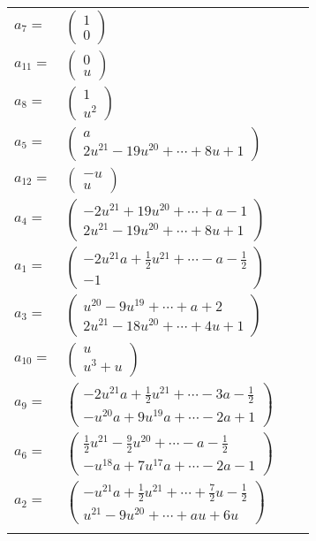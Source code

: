 \documentclass[1p]{elsarticle_modified}
\theoremstyle{definition}
\begin{document}
\begin{tabular}{m{7pt} m{180pt} m{7pt} m{180pt} }
\flushright $a_{7}=$&$\begin{pmatrix}1\\0\end{pmatrix}$ \\
\flushright $a_{11}=$&$\begin{pmatrix}0\\u\end{pmatrix}$ \\
\flushright $a_{8}=$&$\begin{pmatrix}1\\u^2\end{pmatrix}$ \\
\flushright $a_{5}=$&$\begin{pmatrix}a\\2 u^{21}-19 u^{20}+\cdots+8 u+1\end{pmatrix}$ \\
\flushright $a_{12}=$&$\begin{pmatrix}- u\\u\end{pmatrix}$ \\
\flushright $a_{4}=$&$\begin{pmatrix}-2 u^{21}+19 u^{20}+\cdots+a-1\\2 u^{21}-19 u^{20}+\cdots+8 u+1\end{pmatrix}$ \\
\flushright $a_{1}=$&$\begin{pmatrix}-2 u^{21} a+\frac{1}{2} u^{21}+\cdots- a-\frac{1}{2}\\-1\end{pmatrix}$ \\
\flushright $a_{3}=$&$\begin{pmatrix}u^{20}-9 u^{19}+\cdots+a+2\\2 u^{21}-18 u^{20}+\cdots+4 u+1\end{pmatrix}$ \\
\flushright $a_{10}=$&$\begin{pmatrix}u\\u^3+u\end{pmatrix}$ \\
\flushright $a_{9}=$&$\begin{pmatrix}-2 u^{21} a+\frac{1}{2} u^{21}+\cdots-3 a-\frac{1}{2}\\- u^{20} a+9 u^{19} a+\cdots-2 a+1\end{pmatrix}$ \\
\flushright $a_{6}=$&$\begin{pmatrix}\frac{1}{2} u^{21}-\frac{9}{2} u^{20}+\cdots- a-\frac{1}{2}\\- u^{18} a+7 u^{17} a+\cdots-2 a-1\end{pmatrix}$ \\
\flushright $a_{2}=$&$\begin{pmatrix}- u^{21} a+\frac{1}{2} u^{21}+\cdots+\frac{7}{2} u-\frac{1}{2}\\u^{21}-9 u^{20}+\cdots+a u+6 u\end{pmatrix}$\\&\end{tabular}
\end{document}
